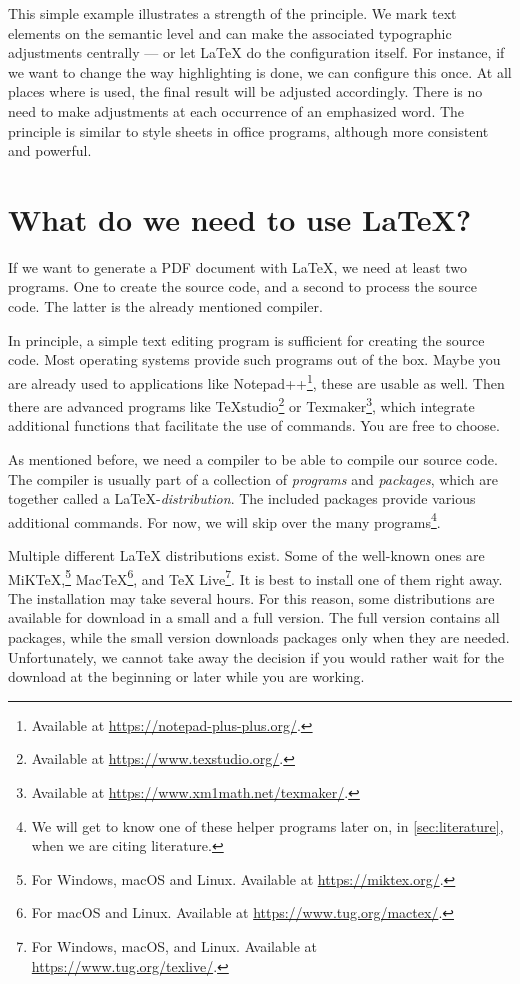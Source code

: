 This simple example illustrates a strength of the  principle. 
We mark text elements on the semantic level and can make the associated typographic adjustments centrally --- or let \LaTeX{} do the configuration itself.
For instance, if we want to change the way highlighting is done, we can configure this once. 
At all places where \texttt{\emph{}} is used, the final result will be adjusted accordingly. 
There is no need to make adjustments at each occurrence of an emphasized word. 
The principle is similar to style sheets in office programs, although more consistent and powerful.

\section{What do we need to use \LaTeX{}?}
\label{subsec:what-we-need}

If we want to generate a PDF document with \LaTeX{}, we need at least two programs. 
One to create the source code, and a second to process the source code. 
The latter is the already mentioned compiler.

In principle, a simple text editing program is sufficient for creating the source code. 
Most operating systems provide such programs out of the box. 
Maybe you are already used to applications like Notepad++\footnote{Available at \url{https://notepad-plus-plus.org/}.}, these are usable as well. 
Then there are advanced programs like \TeX{}studio\footnote{Available at \url{https://www.texstudio.org/}.} or Texmaker\footnote{Available at \url{https://www.xm1math.net/texmaker/}.}, which integrate additional functions that facilitate the use of commands. 
You are free to choose.

As mentioned before, we need a compiler to be able to compile our source code.
The compiler is usually part of a collection of \emph{programs} and \emph{packages}, which are together called a \LaTeX-\emph{distribution}. 
The included packages provide various additional commands. 
For now, we will skip over the many programs\footnote{We will get to know one of these helper programs later on, in \ref{sec:literature}, when we are citing literature.}. 

Multiple different \LaTeX{} distributions exist. 
Some of the well-known ones are MiK\TeX,\footnote{For Windows, macOS and Linux. Available at \url{https://miktex.org/}.} Mac\TeX\footnote{For macOS and Linux. Available at \url{https://www.tug.org/mactex/}.}, and \TeX{} Live\footnote{For Windows, macOS, and Linux. Available at \url{https://www.tug.org/texlive/}.}. 
It is best to install one of them right away. 
The installation may take several hours. 
For this reason, some distributions are available for download in a small and a full version. 
The full version contains all packages, while the small version downloads packages only when they are needed.
Unfortunately, we cannot take away the decision if you would rather wait for the download at the beginning or later while you are working.

